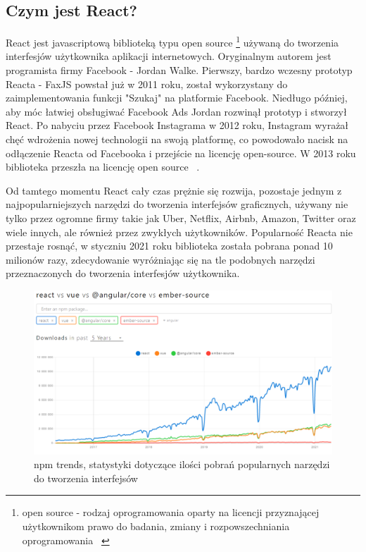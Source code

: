 \documentclass[oneside,polski,logo,indent]{amuthesis}
\begin{document}
\begin{enumerate}
\begin{enumerate}
\section{Czym jest React?}
{
React jest javascriptową biblioteką typu open source \footnote{open source - rodzaj oprogramowania oparty na licencji przyznającej użytkownikom prawo do badania, zmiany i rozpowszechniania oprogramowania ~\cite{opensourcewiki}} używaną do tworzenia interfesjów użytkownika aplikacji internetowych. Oryginalnym autorem jest programista firmy Facebook - Jordan Walke. Pierwszy, bardzo wczesny prototyp Reacta - FaxJS powstał już w 2011 roku, został wykorzystany do zaimplementowania funkcji "Szukaj" na platformie Facebook. Niedługo później, aby móc łatwiej obsługiwać Facebook Ads Jordan rozwinął prototyp i stworzył React. Po nabyciu przez Facebook Instagrama w 2012 roku, Instagram wyrażał chęć wdrożenia nowej technologii na swoją platformę, co powodowało nacisk na odłączenie Reacta od Facebooka i przejście na licencję open-source. W 2013 roku biblioteka przeszła na licencję open source ~\cite{reactstory}. 
\newline

Od tamtego momentu React cały czas prężnie się rozwija, pozostaje jednym z najpopularniejszych narzędzi do tworzenia interfejsów graficznych, używany nie tylko przez ogromne firmy takie jak Uber, Netflix, Airbnb, Amazon, Twitter oraz wiele innych, ale również przez zwykłych użytkowników. Popularność Reacta nie przestaje rosnąć, w styczniu 2021 roku biblioteka została pobrana ponad 10 milionów razy, zdecydowanie wyróżniając się na tle podobnych narzędzi przeznaczonych do tworzenia interfesjów użytkownika.

\begin{figure}
\centering
\includegraphics[width=14cm]{statystyki react vue angular.png}
\caption{npm trends, statystyki dotyczące ilości pobrań popularnych narzędzi do tworzenia interfejsów}
\label{statystyki react vue angular.png}
\end{figure}

}
\end{enumerate}
\end{enumerate}
\end{document}
